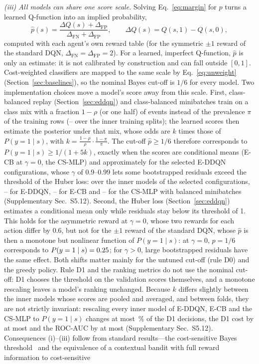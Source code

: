 \emph{(iii) All models can share one score scale.} Solving Eq.~\eqref{eq:margin} for $p$ turns a learned Q-function into an implied probability,
\begin{equation}
\hat p(s)=\frac{\Delta Q(s)+\Delta_{\mathrm{FP}}}{\Delta_{\mathrm{FN}}+\Delta_{\mathrm{FP}}},\qquad \Delta Q(s)=Q(s,1)-Q(s,0),
\label{eq:phat}
\end{equation}
computed with each agent's own reward table (for the symmetric $\pm1$ reward of the standard DQN, $\Delta_{\mathrm{FN}}=\Delta_{\mathrm{FP}}=2$). For a learned, imperfect Q-function, $\hat p$ is only an estimate: it is not calibrated by construction and can fall outside $[0,1]$. Cost-weighted classifiers are mapped to the same scale by Eq.~\eqref{eq:unweight} (Section~\ref{sec:baselines}), so the nominal Bayes cut-off is $1/6$ for every model. Two implementation choices move a model's score away from this scale. First, class-balanced replay (Section~\ref{sec:eddqn}) and class-balanced minibatches train on a class mix with a fraction $1-\rho$ (or one half) of events instead of the prevalence $\pi$ of the training rows (\SSPrevMin--\SSPrevMax{} over the inner training splits); the learned scores then estimate the posterior under that mix, whose odds are $k$ times those of $P(y=1\mid s)$, with $k=\frac{1-\rho}{\rho}\cdot\frac{1-\pi}{\pi}$. The cut-off $\hat p\ge1/6$ therefore corresponds to $P(y=1\mid s)\ge1/(1+5k)$, exactly when the scores are conditional means (E-CB at $\gamma=0$, the CS-MLP) and approximately for the selected E-DDQN configurations, whose $\gamma$ of 0.9--0.99 lets some bootstrapped residuals exceed the threshold of the Huber loss: over the inner models of the selected configurations, \SSEDDQNCutMin--\SSEDDQNCutMax{} for E-DDQN, \SSECBCutMin--\SSECBCutMax{} for E-CB and \SSCSMLPCutMin--\SSCSMLPCutMax{} for the CS-MLP with balanced minibatches (Supplementary Sec.~S5.12). Second, the Huber loss (Section~\ref{sec:eddqn}) estimates a conditional mean only while residuals stay below its threshold of 1. This holds for the asymmetric reward at $\gamma=0$, whose two rewards for each action differ by 0.6, but not for the $\pm1$ reward of the standard DQN, whose $\hat p$ is then a monotone but nonlinear function of $P(y=1\mid s)$: at $\gamma=0$, $\hat p=1/6$ corresponds to $P(y=1\mid s)=0.25$; for $\gamma>0$, large bootstrapped residuals have the same effect. Both shifts matter mainly for the untuned cut-off (rule D0) and the greedy policy. Rule D1 and the ranking metrics do not use the nominal cut-off: D1 chooses the threshold on the validation scores themselves, and a monotone rescaling leaves a model's ranking unchanged. Because $k$ differs slightly between the inner models whose scores are pooled and averaged, and between folds, they are not strictly invariant: rescaling every inner model of E-DDQN, E-CB and the CS-MLP to $P(y=1\mid s)$ changes at most \SSSensMaxChanged\,\% of the D1 decisions, the D1 cost by at most \SSSensMaxCostDelta{} and the ROC-AUC by at most \SSSensMaxAucDelta{} (Supplementary Sec.~S5.12). Consequences (i)--(iii) follow from standard results---the cost-sensitive Bayes threshold~\cite{elkan2001cost} and the equivalence of a contextual bandit with full reward information to cost-sensitive 
